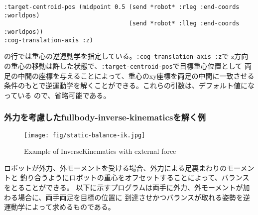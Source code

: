 {\baselineskip=10pt
\begin{verbatim}
:target-centroid-pos (midpoint 0.5 (send *robot* :rleg :end-coords :worldpos)
                                   (send *robot* :lleg :end-coords :worldpos))
:cog-translation-axis :z)
\end{verbatim}
}
の行では重心の逆運動学を指定している。\verb|:cog-translation-axis :z|で
z方向の重心の移動は許した状態で、\verb|:target-centroid-pos|で目標重心位置として
両足の中間の座標を与えることによって、重心のxy座標を両足の中間に一致させる
条件のもとで逆運動学を解くことができる。これらの引数は、デフォルト値になっている
ので、省略可能である。

\subsubsection{外力を考慮したfullbody-inverse-kinematicsを解く例}
\begin{figure}[htb]
  \begin{center}
    \texttt{[image: fig/static-balance-ik.jpg]}
    \caption{Example of InverseKinematics with external force}
  \end{center}
\end{figure}
ロボットが外力、外モーメントを受ける場合、外力による足裏まわりのモーメントと
釣り合うようにロボットの重心をオフセットすることによって、バランスをとることができる。
以下に示すプログラムは両手に外力、外モーメントが加わる場合に、両手両足を目標の位置に
到達させかつバランスが取れる姿勢を逆運動学によって求めるものである。

